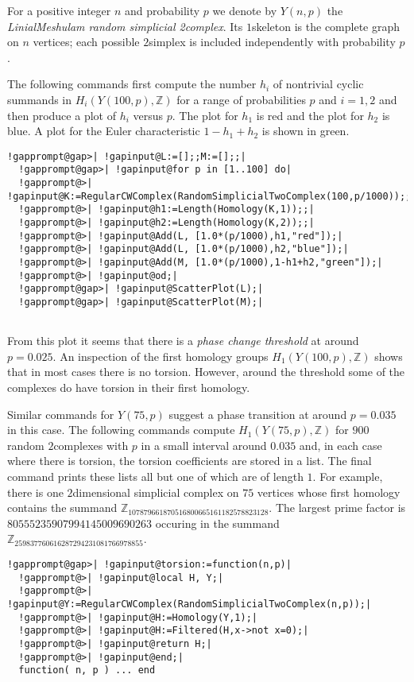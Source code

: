 \documentclass[a4paper,11pt]{report}
\begin{document}
{{For a positive integer $n$ and probability $p$ we denote by $Y(n,p)$ the \emph{Linial\texttt{}Meshulam random simplicial
2\texttt{}complex}. Its $1$\texttt{}skeleton is the complete graph on $n$ vertices; each possible $2$\texttt{}simplex is included independently with probability $p$. 

The following commands first compute the number $h_i$ of non\texttt{}trivial cyclic summands in $H_i(Y(100,p), \mathbb Z)$ for a range of probabilities $p$ and $i=1,2$ and then produce a plot of $h_i$ versus $p$. The plot for $h_1$ is red and the plot for $h_2$ is blue. A plot for the Euler characteristic $1-h_1+h_2$ is shown in green. 
\begin{Verbatim}[commandchars=!@|,fontsize=\small,frame=single,label=Example]
  !gapprompt@gap>| !gapinput@L:=[];;M:=[];;|
  !gapprompt@gap>| !gapinput@for p in [1..100] do|
  !gapprompt@>| !gapinput@K:=RegularCWComplex(RandomSimplicialTwoComplex(100,p/1000));;|
  !gapprompt@>| !gapinput@h1:=Length(Homology(K,1));;|
  !gapprompt@>| !gapinput@h2:=Length(Homology(K,2));;|
  !gapprompt@>| !gapinput@Add(L, [1.0*(p/1000),h1,"red"]);|
  !gapprompt@>| !gapinput@Add(L, [1.0*(p/1000),h2,"blue"]);|
  !gapprompt@>| !gapinput@Add(M, [1.0*(p/1000),1-h1+h2,"green"]);|
  !gapprompt@>| !gapinput@od;|
  !gapprompt@gap>| !gapinput@ScatterPlot(L);|
  !gapprompt@gap>| !gapinput@ScatterPlot(M);|
  
\end{Verbatim}
 

   

From this plot it seems that there is a \emph{phase change threshold} at around $p=0.025$. An inspection of the first homology groups $H_1(Y(100,p), \mathbb Z)$ shows that in most cases there is no torsion. However, around the threshold
some of the complexes do have torsion in their first homology. 

Similar commands for $Y(75,p)$ suggest a phase transition at around $p=0.035$ in this case. The following commands compute $H_1(Y(75,p), \mathbb Z)$ for $900$ random $2$\texttt{}complexes with $p$ in a small interval around $ 0.035$ and, in each case where there is torsion, the torsion coefficients are stored
in a list. The final command prints these lists
\texttt{}\texttt{} all but one of which are of length $1$. For example, there is one $2$\texttt{}dimensional simplicial complex on $75$ vertices whose first homology contains the summand $\mathbb Z_{107879661870516800665161182578823128}$. The largest prime factor is $80555235907994145009690263$ occuring in the summand $\mathbb Z_{259837760616287294231081766978855}$. 
\begin{Verbatim}[commandchars=!@|,fontsize=\small,frame=single,label=Example]
  !gapprompt@gap>| !gapinput@torsion:=function(n,p)|
  !gapprompt@>| !gapinput@local H, Y;|
  !gapprompt@>| !gapinput@Y:=RegularCWComplex(RandomSimplicialTwoComplex(n,p));|
  !gapprompt@>| !gapinput@H:=Homology(Y,1);|
  !gapprompt@>| !gapinput@H:=Filtered(H,x->not x=0);|
  !gapprompt@>| !gapinput@return H;|
  !gapprompt@>| !gapinput@end;|
  function( n, p ) ... end
  

\end{Verbatim}}}
\end{document}
